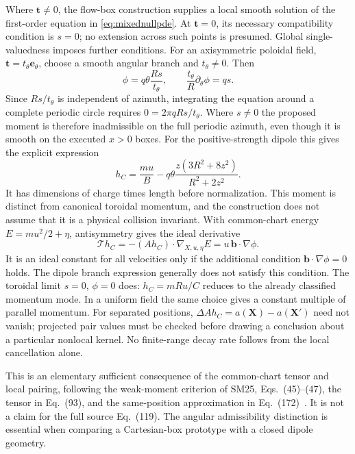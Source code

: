 \documentclass[11pt,letterpaper]{article}
\newcommand{\X}{\mathbf X}
\begin{document}
Where $\mathbf t\ne0$, the flow-box construction supplies a local smooth
solution of the first-order equation in \eqref{eq:mixednullpde}. At
$\mathbf t=0$, its necessary compatibility condition is $s=0$; no extension
across such points is presumed. Global single-valuedness imposes further
conditions. For an axisymmetric poloidal field,
$\mathbf t=t_\theta\mathbf e_\theta$, choose a smooth angular branch and
$t_\theta\ne0$. Then
\begin{equation}
 \phi=q\theta\frac{R s}{t_\theta},\qquad
 \frac{t_\theta}{R}\partial_\theta\phi=q s.
 \label{eq:mixednullangle}
\end{equation}
Since $R s/t_\theta$ is independent of azimuth, integrating the equation
around a complete periodic circle requires $0=2\pi qR s/t_\theta$.
Where $s\ne0$ the proposed moment is therefore inadmissible on the full
periodic azimuth, even though it is smooth on the executed $x>0$ boxes.
For the positive-strength dipole this gives the explicit expression
\begin{equation}
 h_C=\frac{m u}{B}
   -q\theta\frac{z(3R^2+8z^2)}{R^2+2z^2}.
 \label{eq:dipolemixednull}
\end{equation}
It has dimensions of charge times length before normalization. This moment
is distinct from canonical toroidal momentum, and the construction does not
assume that it is a physical collision invariant. With common-chart energy
$E=m u^2/2+\eta$, antisymmetry gives the ideal derivative
\begin{equation}
 \mathcal T h_C=-(A h_C)\cdot\nabla_{X,u,\eta}E
       =u\,\mathbf b\cdot\nabla\phi.
 \label{eq:mixednullideal}
\end{equation}
It is an ideal constant for all velocities only if the additional condition
$\mathbf b\cdot\nabla\phi=0$ holds. The dipole branch expression generally
does not satisfy this condition. The toroidal limit $s=0$, $\phi=0$ does:
$h_C=mRu/C$ reduces to the already classified momentum mode. In a uniform
field the same choice gives a constant multiple of parallel momentum.
For separated positions, $\Delta A h_C=a(\X)-a(\X')$ need not vanish;
projected pair values must be checked before drawing a conclusion about a
particular nonlocal kernel. No finite-range decay rate follows from the
local cancellation alone.

This is an elementary sufficient consequence of the common-chart tensor
and local pairing, following the weak-moment criterion of SM25,
Eqs.~(45)--(47), the tensor in Eq.~(93), and the same-position approximation
in Eq.~(172)~\cite{SM25}. It is not a claim for the full source Eq.~(119).
The angular admissibility distinction is essential when comparing a
Cartesian-box prototype with a closed dipole geometry.
\end{document}
